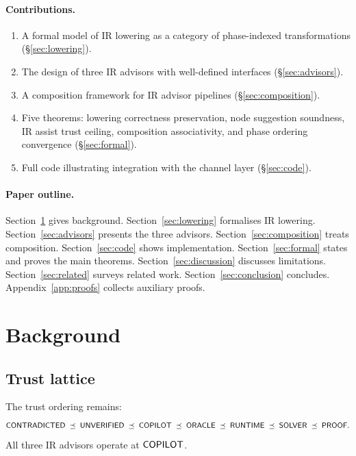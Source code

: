 \documentclass[11pt]{article}
\begin{document}
\paragraph{Contributions.}
\begin{enumerate}
\item A formal model of IR lowering as a category of
      phase-indexed transformations (\S\ref{sec:lowering}).
\item The design of three IR advisors with well-defined
      interfaces (\S\ref{sec:advisors}).
\item A composition framework for IR advisor pipelines
      (\S\ref{sec:composition}).
\item Five theorems: lowering correctness preservation,
      node suggestion soundness, IR assist trust ceiling,
      composition associativity, and phase ordering
      convergence (\S\ref{sec:formal}).
\item Full \Python{} code illustrating integration with
      the channel layer (\S\ref{sec:code}).
\end{enumerate}

\paragraph{Paper outline.}
Section~\ref{sec:background} gives background.
Section~\ref{sec:lowering} formalises IR lowering.
Section~\ref{sec:advisors} presents the three advisors.
Section~\ref{sec:composition} treats composition.
Section~\ref{sec:code} shows implementation.
Section~\ref{sec:formal} states and proves the main theorems.
Section~\ref{sec:discussion} discusses limitations.
Section~\ref{sec:related} surveys related work.
Section~\ref{sec:conclusion} concludes.
Appendix~\ref{app:proofs} collects auxiliary proofs.

\section{Background}\label{sec:background}

\subsection{Trust lattice}

The trust ordering remains:
\[
  \mathsf{CONTRADICTED} \;\preceq\; \mathsf{UNVERIFIED} \;\preceq\; \mathsf{COPILOT}
  \;\preceq\; \mathsf{ORACLE} \;\preceq\; \mathsf{RUNTIME}
  \;\preceq\; \mathsf{SOLVER} \;\preceq\; \mathsf{PROOF}.
\]
All three IR advisors operate at $\mathsf{COPILOT}$.
\end{document}

